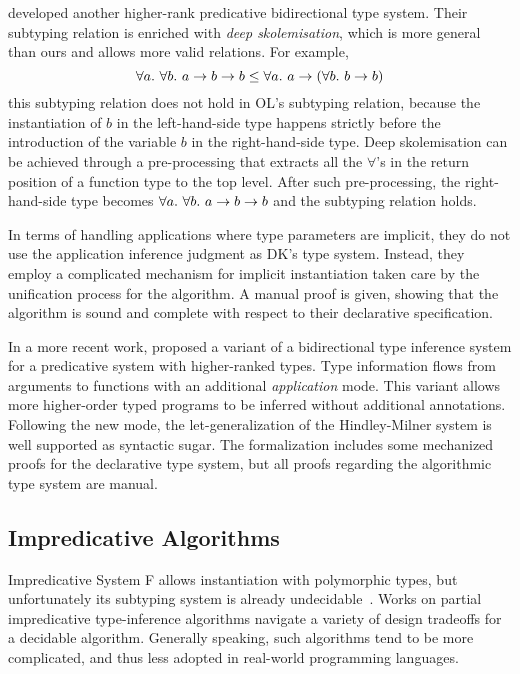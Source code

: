 \citet{jones2007practical} developed another higher-rank predicative bidirectional type system.
Their subtyping relation is enriched with \emph{deep skolemisation},
which is more general than ours and allows more valid relations.
For example,
$$\all{\all[b] a \to b \to b} \le \all a \to (\all[b] b \to b)$$
this subtyping relation does not hold in OL's subtyping relation,
because the instantiation of $b$ in the left-hand-side type
happens strictly before the introduction of
the variable $b$ in the right-hand-side type.
Deep skolemisation can be achieved through
a pre-processing that extracts all the $\forall$'s
in the return position of a function type to the top level.
After such pre-processing, the right-hand-side type becomes
$\all {\all[b] a \to b \to b}$ and the subtyping relation holds.

In terms of handling applications where type parameters are implicit,
they do not use the application inference judgment as DK's type system.
Instead, they employ a complicated mechanism for implicit instantiation
taken care by the unification process for the algorithm.
A manual proof is given, showing that the algorithm is sound and
complete with respect to their declarative specification.

In a more recent work, \citet{xie2018letarguments} proposed a variant of a
bidirectional type inference system for a predicative system with higher-ranked types.
Type information flows from arguments to
functions with an additional \emph{application} mode. This variant 
allows more higher-order typed programs to be inferred without additional annotations.
Following the new mode, the let-generalization of the Hindley-Milner system
is well supported as syntactic sugar. The formalization includes some
mechanized proofs for the declarative type system, but all proofs regarding
the algorithmic type system are manual.

\subsection{Impredicative Algorithms}

Impredicative System F allows instantiation with polymorphic types,
but unfortunately its subtyping system is already undecidable~\citep{tiuryn1996subtyping}.
Works on partial impredicative type-inference algorithms
navigate a variety of design tradeoffs for a decidable algorithm.
Generally speaking, such algorithms tend to be more complicated,
and thus less adopted in real-world programming languages.

